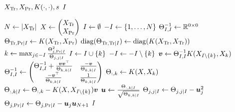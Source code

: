 \begin{algorithmic}[1]
  \REQUIRE \( X_{\text{Tr}}, X_{\text{Pr}}, K(\cdot, \cdot), s \)
  \ENSURE \( I \)

  \STATE \( N \gets \lvert X_{\text{Tr}}\rvert \)
  \STATE \(
    X \gets
    \begin{pmatrix}
      X_{\text{Tr}} \\
      X_{\text{Pr}}
    \end{pmatrix}
  \)
  \STATE \( I \gets \emptyset \)
  \STATE \( -I \gets \{ 1, \dotsc, N \} \)
  \STATE \( \Theta_{I, I}^{-1} \gets \mathbb{R}^{0 \times 0} \)
  \STATE \(
    \Theta_{\text{Tr}, \text{Pr} \mid I} \gets
    K(X_{\text{Tr}}, X_{\text{Pr}})
  \)
  \STATE \(
    \operatorname{diag}(\Theta_{\text{Tr}, \text{Tr} \mid I}) \gets
    \operatorname{diag}(K(X_{\text{Tr}}, X_{\text{Tr}}))
  \)
    \STATE \(
      k \gets \max_{j \in -I}
      \frac{\Theta_{j, \text{Pr} \mid I}^2}{\Theta_{j, j \mid I}}
    \)
    \STATE \( I \gets I \cup \{ k \} \)
    \STATE \( -I \gets -I \setminus \{ k \} \)
    \STATE \( \bm{v} \gets \Theta_{I, I}^{-1}
      K(X_{I \setminus \{ k \}}, X_k) \)
    \STATE \(
      \Theta_{I, I}^{-1} \gets
      \begin{pmatrix}
        \Theta_{I, I}^{-1} + \frac{\bm{v} \bm{v}^{\top}}{\Theta_{k, k \mid I}} &
        \frac{-\bm{v}}{\Theta_{k, k \mid I}} \\
        \frac{-\bm{v}^{\top}}{\Theta_{k, k \mid I}} &
        \frac{1}{\Theta_{k, k \mid I}}
      \end{pmatrix}
    \)
    \STATE \( \Theta_{:, k} \gets K(X, X_k) \)
    \STATE \(
      \Theta_{:, k \mid I} \gets \Theta_{:, k} -
      K(X, X_{I \setminus \{ k \}}) \bm{v}
    \)
    \STATE \(
      \bm{u} \gets \frac{\Theta_{:, k \mid I}}{\sqrt{\Theta_{k, k \mid I}}}
    \)
      \STATE \(
        \Theta_{j, j \mid I} \gets
        \Theta_{j, j \mid I} -
        \bm{u}_j^2
      \)
      \STATE \(
        \Theta_{j, \text{Pr} \mid I} \gets
        \Theta_{j, \text{Pr} \mid I} -
        \bm{u}_j \bm{u}_{N + 1}
      \)
    \ENDFOR
  \ENDWHILE
  \RETURN \( I \)
\end{algorithmic}
